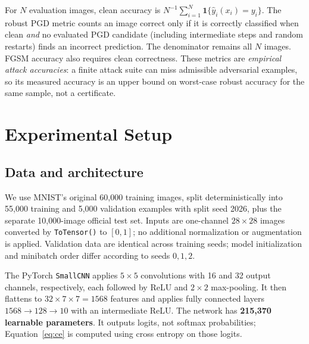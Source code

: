 \documentclass[11pt,a4paper]{article}
\newif\ifshowguides
\newcommand{\guide}[1]{%
  \ifshowguides
  \par\medskip\noindent
  \fcolorbox{guideframe}{guidebg}{%
    \begin{minipage}{\dimexpr\linewidth-2\fboxsep-2\fboxrule\relax}
      \small\textbf{Guide.}
      \begin{itemize}[leftmargin=1.2em,itemsep=1pt,topsep=2pt]
        #1
      \end{itemize}
    \end{minipage}}%
  \par\medskip
  \fi}
\begin{document}
For $N$ evaluation images, clean accuracy is $N^{-1}\sum_{i=1}^N\mathbf 1\{\hat y_i(x_i)=y_i\}$. The robust PGD metric counts an image correct only if it is correctly classified when clean \emph{and} no evaluated PGD candidate (including intermediate steps and random restarts) finds an incorrect prediction. The denominator remains all $N$ images. FGSM accuracy also requires clean correctness. These metrics are \emph{empirical attack accuracies}: a finite attack suite can miss admissible adversarial examples, so its measured accuracy is an upper bound on worst-case robust accuracy for the same sample, not a certificate.


\guide{
  \item This is the theory part of the project.
  \item Derive the key equations yourselves, step by step. Do not copy the final formula from the paper; show how it follows from its starting assumptions.
  \item Define every symbol at first use and state the shape of every vector, matrix and tensor.
  \item Use course notation where it exists. Cite course material or textbooks for standard results.
  \item Explain \emph{why} the method should produce the claimed effect, not only \emph{what} it computes.
  \item Every group member must be able to reproduce this derivation on the board during the presentation.
}

\section{Experimental Setup}
\label{sec:setup}
\subsection{Data and architecture}
We use MNIST's original 60,000 training images, split deterministically into 55,000 training and 5,000 validation examples with split seed 2026, plus the separate 10,000-image official test set. Inputs are one-channel $28\times28$ images converted by \texttt{ToTensor()} to $[0,1]$; no additional normalization or augmentation is applied. Validation data are identical across training seeds; model initialization and minibatch order differ according to seeds $0,1,2$.

The PyTorch \texttt{SmallCNN} applies $5\times5$ convolutions with 16 and 32 output channels, respectively, each followed by ReLU and $2\times2$ max-pooling. It then flattens to $32\times7\times7=1568$ features and applies fully connected layers $1568\rightarrow128\rightarrow10$ with an intermediate ReLU. The network has \textbf{215,370 learnable parameters}. It outputs logits, not softmax probabilities; Equation~\ref{eq:ce} is computed using cross entropy on those logits.
\end{document}

